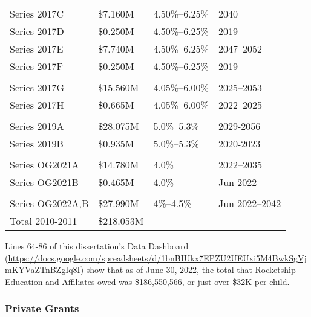 \begin{table}[ht]
\begin{tabular}{llll}
    Series 2017C     & \$7.160M  & 4.50\%–6.25\%  & 2040               \\
    Series 2017D     & \$0.250M  & 4.50\%–6.25\%  & 2019               \\
    Series 2017E     & \$7.740M  & 4.50\%–6.25\%  & 2047–2052          \\
    Series 2017F     & \$0.250M  & 4.50\%–6.25\%  & 2019               \\
                                                                       \\
    Series 2017G     & \$15.560M & 4.05\%–6.00\%  & 2025–2053          \\
    Series 2017H     & \$0.665M  &  4.05\%–6.00\% & 2022–2025          \\
                                                                       \\
    Series 2019A     & \$28.075M & 5.0\%–5.3\%    & 2029-2056          \\
    Series 2019B     & \$0.935M  & 5.0\%–5.3\%    & 2020-2023          \\
                                                                       \\
    Series OG2021A   & \$14.780M & 4.0\%          & 2022–2035          \\
    Series OG2021B   & \$0.465M  & 4.0\%          & Jun 2022           \\
                                                                       \\
    Series OG2022A,B & \$27.990M & 4\%–4.5\%      & Jun 2022–2042      \\
    \midrule
    Total 2010-2011  & \$218.053M                                      \\
    \bottomrule
  \end{tabular}
\end{table}

Lines 64-86 of this dissertation's Data Dashboard (\url{https://docs.google.com/spreadsheets/d/1bnBIUkx7EPZU2UEUxi5M4BwkSgVjmKYVaZTnBZgIq8I}) show that as of June 30, 2022, the total that Rocketship Education and Affiliates owed was \$186,550,566, or just over \$32K per child.

\subsubsection{Private Grants}%
\label{sec:private-grants}\indent%

